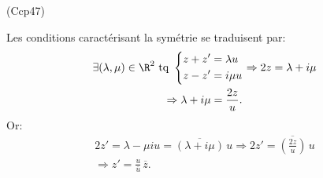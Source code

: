 \begin{tiny}(Ccp47)\end{tiny} Les conditions caractérisant la symétrie se traduisent par:
\begin{multline*}
  \exists (\lambda, \mu)\in \R^2 \text{ tq } 
  \left\lbrace 
  \begin{aligned}
    z + z' &= \lambda u \\
    z - z' &= i \mu u
  \end{aligned}
\right. 
\Rightarrow
2z = \lambda + i \mu \\
\Rightarrow \lambda + i \mu = \frac{2z}{u}.
\end{multline*}
Or:
\begin{multline*}
  2z' = \lambda - \mu i u = \overline{(\lambda + i \mu)}\, u
  \Rightarrow 2z' = \overline{\left( \frac{2z}{u}\right) }\, u\\
  \Rightarrow z' = \frac{u}{\overline{u}}\, \overline{z}.
\end{multline*}
